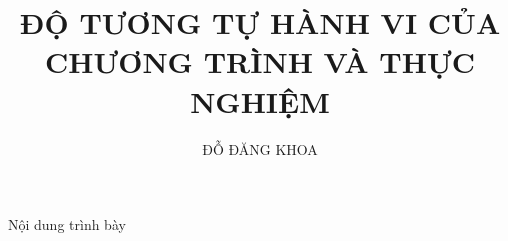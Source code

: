 \documentclass[11pt]{beamer}
\title{ĐỘ TƯƠNG TỰ HÀNH VI CỦA CHƯƠNG TRÌNH VÀ THỰC NGHIỆM}
\author{ĐỖ ĐĂNG KHOA}
\institute{Người hướng dẫn: TS.PHẠM VĂN VIỆT}
\begin{document}
\begin{frame}
\titlepage 
\end{frame}
\begin{frame}{Nội dung trình bày}
\tableofcontents 
\end{frame}






\end{document}
